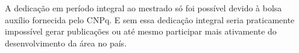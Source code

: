\documentclass[
  12pt,       %
  oneside,
  a4paper,      %
  english,      %
  french,       %
  spanish,      %
  brazil,       %
  ]{abntex2}
\begin{document}
A dedicação em período integral ao mestrado só foi possível devido à bolsa auxílio fornecida pelo CNPq.
E sem essa dedicação integral seria praticamente impossível gerar publicações ou até mesmo participar mais ativamente do desenvolvimento da área no país.


\postextual


\end{document}
